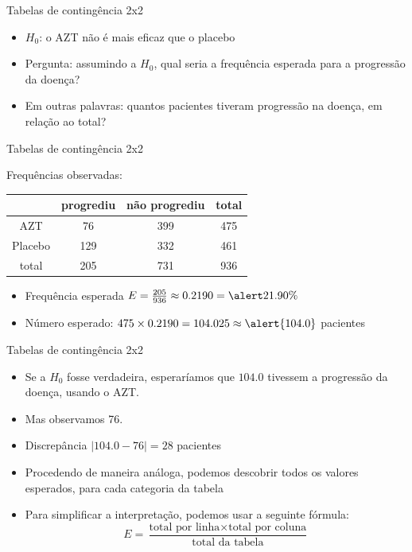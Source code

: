\documentclass{beamer}
\begin{document}
\begin{frame}{Tabelas de contingência 2x2}
  \begin{itemize}
  \item $H_0$: o AZT não é mais eficaz que o placebo
  \item Pergunta: assumindo a $H_0$, qual seria a frequência esperada
    para a progressão da doença?
  \item Em outras palavras: quantos pacientes tiveram progressão na
    doença, em relação ao total?
  \end{itemize}
\end{frame}

\begin{frame}{Tabelas de contingência 2x2}
  \begin{example}
    Frequências observadas:
    \begin{tabular}{c|c|c|c}
      & progrediu & não progrediu & total\\
      \hline
      AZT & 76 & 399 & 475\\
      \hline
      Placebo & 129 & 332 & 461\\
      \hline
      total & \alert{205} & 731 & \alert{936}\\
    \end{tabular}
  \end{example}
  \begin{itemize}
  \item Frequência esperada $E = \frac{205}{936} \approx 0.2190 = \alert{21.90\%}$
  \item Número esperado: $475 \times 0.2190 = 104.025 \approx \alert{104.0}$
    pacientes
  \end{itemize}
\end{frame}

\begin{frame}{Tabelas de contingência 2x2}
  \begin{itemize}
  \item Se a $H_0$ fosse verdadeira, esperaríamos que $104.0$ tivessem
    a progressão da doença, usando o AZT.
  \item Mas observamos 76.
  \item Discrepância $|104.0 - 76| = 28$ pacientes
  \item Procedendo de maneira análoga, podemos descobrir todos os
    valores esperados, para cada categoria da tabela
  \item Para simplificar a interpretação, podemos usar a seguinte fórmula:
  \begin{displaymath}
    E = \frac{ \text{total por linha} \times \text{total por coluna}
    }{ \text{total da tabela} }
  \end{displaymath}
  \end{itemize}
\end{frame}
\end{document}

